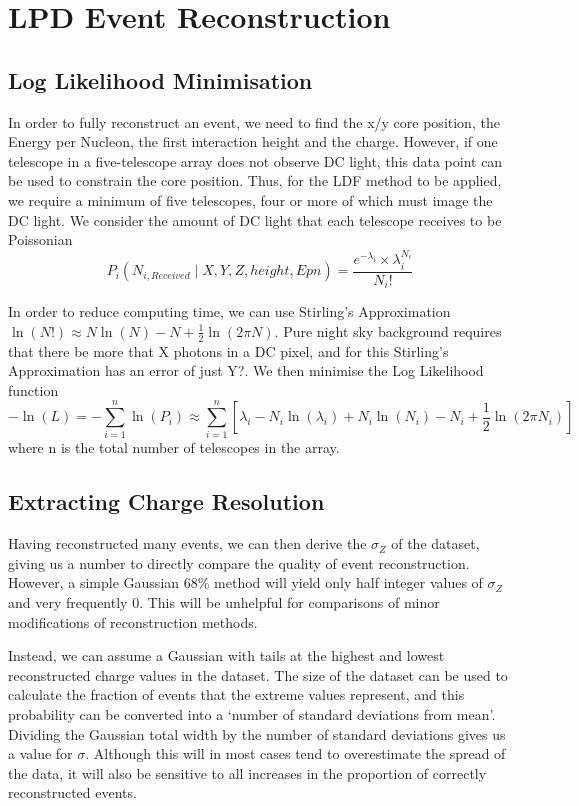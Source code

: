 \documentclass{article}
\begin{document}
\section{LPD Event Reconstruction}

\subsection{Log Likelihood Minimisation}
In order to fully reconstruct an event, we need to find the x/y core position, the Energy per Nucleon, the first interaction height and the charge. However, if one telescope in a five-telescope array does not observe DC light, this data point can be used to constrain the core position. Thus, for the LDF method to be applied, we require a minimum of five telescopes, four or more of which must image the DC light. We consider the amount of DC light that each telescope receives to be Poissonian \[  P_{i} ( N_{i, Received} \mid X, Y, Z, height, Epn )  =  \frac{ e^{- \lambda_{i} } \times \lambda_{i} ^{N_{i}} }{N_{i}!} \]

In order to reduce computing time, we can use Stirling's Approximation $\ln( N! )  \approx  N \ln(N) - N + \frac{1}{2} \ln(2 \pi N)$. Pure night sky background requires that there be more that X photons in a DC pixel, and for this Stirling's Approximation has an error of just Y?. We then minimise the Log Likelihood function \[ - \ln(L) = - \sum_{i=1}^{n} \ln(P_{i}) \approx  \sum_{i=1}^{n} [\lambda _{i} - N_{i} \ln(\lambda _{i}) + N_{i} \ln(N_{i}) - N_{i} + \frac{1}{2} \ln(2 \pi N_{i})]  \] where n is the total number of telescopes in the array.

\subsection{Extracting Charge Resolution}
Having reconstructed many events, we can then derive the $\sigma_{Z}$ of the dataset, giving us a number to directly compare the quality of event reconstruction. However, a simple Gaussian 68\% method will yield only half integer values of $\sigma_{Z}$ and very frequently 0. This will be unhelpful for comparisons of minor modifications of reconstruction methods.

Instead, we can assume a Gaussian with tails at the highest and lowest reconstructed charge values in the dataset. The size of the dataset can be used to calculate the fraction of events that the extreme values represent, and this probability can be converted into a \textquoteleft number of standard deviations from mean'. Dividing the Gaussian total width by the number of standard deviations gives us a value for $\sigma$. Although this will in most cases tend to overestimate the spread of the data, it will also be sensitive to all increases in the proportion of correctly reconstructed events.
\end{document}
